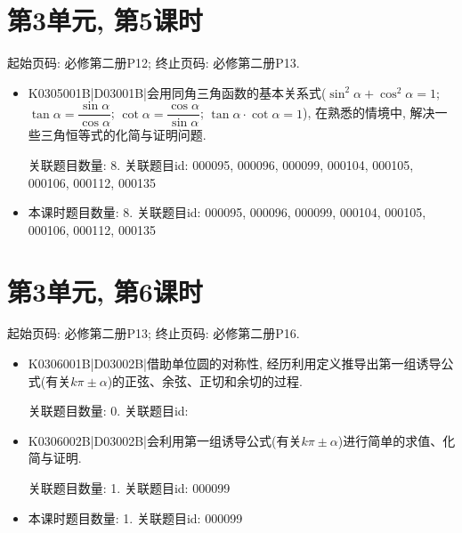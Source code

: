 \section*{第3单元, 第5课时}
起始页码: 必修第二册P12; 终止页码: 必修第二册P13.
\begin{itemize}
\item K0305001B|D03001B|会用同角三角函数的基本关系式($\sin^2\alpha+\cos^2\alpha=1$; $\tan\alpha=\dfrac{\sin\alpha}{\cos\alpha}$; $\cot\alpha=\dfrac{\cos\alpha}{\sin\alpha}$; $\tan\alpha\cdot \cot\alpha=1$), 在熟悉的情境中, 解决一些三角恒等式的化简与证明问题.

关联题目数量: 8. 关联题目id: 000095, 000096, 000099, 000104, 000105, 000106, 000112, 000135

\item 本课时题目数量: 8. 关联题目id: 000095, 000096, 000099, 000104, 000105, 000106, 000112, 000135

\end{itemize}

\section*{第3单元, 第6课时}
起始页码: 必修第二册P13; 终止页码: 必修第二册P16.
\begin{itemize}
\item K0306001B|D03002B|借助单位圆的对称性, 经历利用定义推导出第一组诱导公式(有关$k\pi\pm \alpha$)的正弦、余弦、正切和余切的过程.

关联题目数量: 0. 关联题目id: 

\item K0306002B|D03002B|会利用第一组诱导公式(有关$k\pi\pm \alpha$)进行简单的求值、化简与证明.

关联题目数量: 1. 关联题目id: 000099

\item 本课时题目数量: 1. 关联题目id: 000099

\end{itemize}

